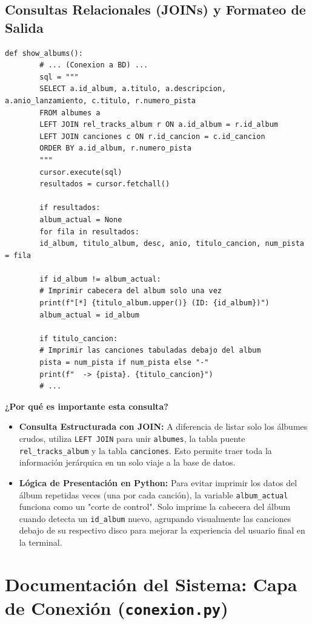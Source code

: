 \documentclass[11pt]{article}
\begin{document}
	\vspace{0.5cm}
	
	\subsection{Consultas Relacionales (JOINs) y Formateo de Salida}
	\begin{lstlisting}[style=pythonstyle]
		def show_albums():
		# ... (Conexion a BD) ...
		sql = """
		SELECT a.id_album, a.titulo, a.descripcion, a.anio_lanzamiento, c.titulo, r.numero_pista
		FROM albumes a
		LEFT JOIN rel_tracks_album r ON a.id_album = r.id_album
		LEFT JOIN canciones c ON r.id_cancion = c.id_cancion
		ORDER BY a.id_album, r.numero_pista
		"""
		cursor.execute(sql)
		resultados = cursor.fetchall()
		
		if resultados:
		album_actual = None  
		for fila in resultados:
		id_album, titulo_album, desc, anio, titulo_cancion, num_pista = fila
		
		if id_album != album_actual:
		# Imprimir cabecera del album solo una vez
		print(f"[*] {titulo_album.upper()} (ID: {id_album})")
		album_actual = id_album
		
		if titulo_cancion:
		# Imprimir las canciones tabuladas debajo del album
		pista = num_pista if num_pista else "-"
		print(f"  -> {pista}. {titulo_cancion}")
		# ...
	\end{lstlisting}
	
	\noindent\textbf{¿Por qué es importante esta consulta?}
	\begin{itemize}[noitemsep,topsep=2pt]
		\item \textbf{Consulta Estructurada con JOIN:} A diferencia de listar solo los álbumes crudos, utiliza \texttt{LEFT JOIN} para unir \texttt{albumes}, la tabla puente \texttt{rel\_tracks\_album} y la tabla \texttt{canciones}. Esto permite traer toda la información jerárquica en un solo viaje a la base de datos.
		\item \textbf{Lógica de Presentación en Python:} Para evitar imprimir los datos del álbum repetidas veces (una por cada canción), la variable \texttt{album\_actual} funciona como un "corte de control". Solo imprime la cabecera del álbum cuando detecta un \texttt{id\_album} nuevo, agrupando visualmente las canciones debajo de su respectivo disco para mejorar la experiencia del usuario final en la terminal.
	\end{itemize}
	
	\newpage
	\section{Documentación del Sistema: Capa de Conexión (\texttt{conexion.py})}
	
\end{document}

